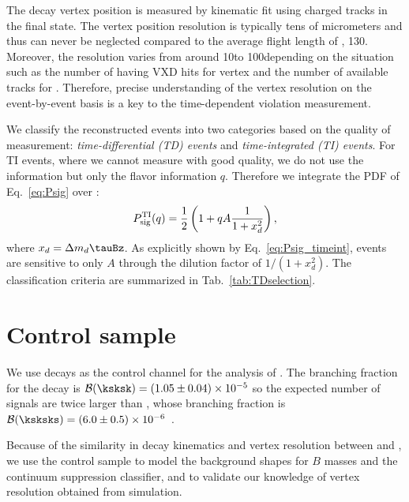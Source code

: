 The decay vertex position is measured by kinematic fit using charged tracks in the final state.
The vertex position resolution is typically tens of micrometers and thus can never be neglected compared to the average flight length of \Bz, 130\mum.
Moreover, the resolution varies from around 10\mum to 100\mum depending on the situation such as the number of \KS having VXD hits for \BCP vertex and the number of available tracks for \Btag.
Therefore, precise understanding of the vertex resolution on the event-by-event basis is a key to the time-dependent \cp violation measurement.

We classify the reconstructed events into two categories based on the quality of \deltat measurement: \textit{time-differential (TD) events} and \textit{time-integrated (TI) events}.
For TI events, where we cannot measure \deltat with good quality, we do not use the \deltat information but only the flavor information $q$.
Therefore we integrate the PDF of Eq.~\eqref{eq:Psig} over \deltat:
\begin{eqnarray}\label{eq:Psig_timeint}
P_{\rm sig}^{\rm TI}(q) = \frac{1}{2} \left( 1 + qA\frac{1}{1 + x_d^2} \right),
\end{eqnarray}
where $x_d = \Delta m_d \tauBz$.
As explicitly shown by Eq.~\eqref{eq:Psig_timeint}, \baddt events are sensitive to only $A$ through the dilution factor of $1/(1+x_d^2)$.
The classification criteria are summarized in Tab.~\ref{tab:TDselection}.

\section{Control sample}
We use \ksksk decays as the control channel for the analysis of \ksksks.
The branching fraction for the decay is $\mathcal{B}(\ksksk) = (1.05 \pm 0.04) \times 10^{-5}$ so the expected number of signals are twice larger than \ksksks, whose branching fraction is $\mathcal{B}(\ksksks) = (6.0 \pm 0.5) \times 10^{-6}$~\cite{ref:PDG2021}.

Because of the similarity in decay kinematics and vertex resolution between \ksksk and \ksksks, we use the control sample to model the background shapes for $B$ masses and the continuum suppression classifier, and to validate our knowledge of vertex resolution obtained from simulation.

